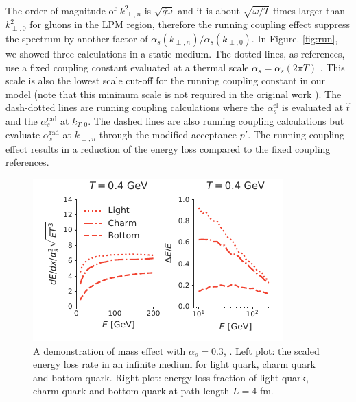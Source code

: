 \documentclass[aps, prc, reprint, amsmath, groupedaddress, nofootinbib]{revtex4-1}
\begin{document}
The order of magnitude of $k_{\perp,n}^2$ is $\sqrt{\hat{q}\omega}$ and it is about $\sqrt{\omega/T}$ times larger than $k_{\perp,0}^2$ for gluons in the LPM region, therefore the running coupling effect suppress the spectrum by another factor of $\alpha_s(k_{\perp,n})/\alpha_s(k_{\perp,0})$.
In Figure. \ref{fig:run}, we showed three calculations in a static medium. The dotted lines, as references, use a fixed coupling constant evaluated at a thermal scale $\alpha_s = \alpha_s(2\pi T)$ .
This scale is also the lowest scale cut-off for the running coupling constant in our model (note that this minimum scale is not required in the original work \cite{Arnold:2008zu}).
The dash-dotted lines are running coupling calculations where the $\alpha_s^{\textrm{el}}$ is evaluated at $\hat{t}$ and the $\alpha_s^{\textrm{rad}}$ at $k_{T,0}$.
The dashed lines are also running coupling calculations but evaluate $\alpha_s^{\textrm{rad}}$ at $k_{\perp,n}$ through the modified acceptance $p'$.
The running coupling effect results in a reduction of the energy loss compared to the fixed coupling references.

\begin{figure}
\includegraphics[width=\columnwidth]{Eloss_mass.pdf}
\caption{A demonstration of mass effect with $\alpha_s=0.3$, . Left plot: the scaled energy loss rate in an infinite medium for light quark, charm quark and bottom quark. Right plot: energy loss fraction of light quark, charm quark and bottom quark at path length $L=4$ fm.  }
\label{fig:mass}
\end{figure}
\end{document}
